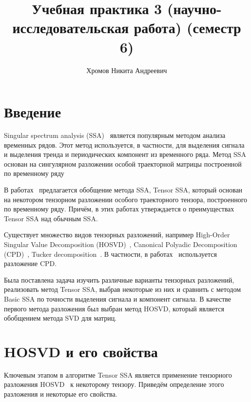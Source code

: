\documentclass[specialist,
    substylefile = spbu_report.rtx,
    subf,href,colorlinks=true, 12pt]{disser}
\theoremstyle{plain}
\theoremstyle{definition}
\theoremstyle{remark}
\begin{document}
    \title{Учебная практика 3 (научно-исследовательская работа) (семестр 6)}
    \author{Хромов Никита Андреевич}
    \date{\number\year}
    \maketitle

    \tableofcontents


    \section{Введение}\label{sec:intro}
    Singular spectrum analysis (SSA)~\cite{ssa} является популярным методом анализа временных рядов.
    Этот метод используется, в частности, для выделения сигнала и выделения тренда и периодических компонент из временного ряда.
    Метод SSA основан на сингулярном разложении особой траекторной матрицы построенной по временному ряду

    В работах~\cite{TSSA, TSSA-improved} предлагается обобщение метода SSA, Tensor SSA, который основан на некотором
    тензорном разложении особого траекторного тензора, построенного по временному ряду.
    Причём, в этих работах утверждается о преимуществах Tensor SSA над обычным SSA\@.

    Существует множество видов тензорных разложений, например High-Order Singular Value Decomposition (HOSVD)~\cite{hosvd},
    Canonical Polyadic Decomposition (CPD)~\cite{parafac1, parafac2}, Tucker decomposition~\cite{tucker}.
    В частности, в работах~\cite{TSSA, TSSA-improved} используется разложение CPD\@.

    Была поставлена задача изучить различные варианты тензорных разложений, реализовать метод Tensor SSA, выбрав некоторые из них
    и сравнить с методом Basic SSA по точности выделения сигнала и компонент сигнала.
    В качестве первого метода разложения был выбран метод HOSVD, который является обобщением метода SVD для матриц.
    \newpage


    \section{HOSVD и его свойства}\label{sec:hosvd}
    Ключевым этапом в алгоритме Tensor SSA является применение тензорного разложения HOSVD~\cite{hosvd} к некоторому тензору.
    Приведём определение этого разложения и некоторые его свойства.
\end{document}

